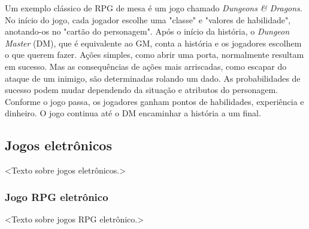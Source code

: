 \documentclass[
	12pt,					%
	openright,				%
	oneside,				%
	a4paper,				%
	bibjustif,				%
	chapter=TITLE,			%
	english,				%
	brazil,					%
	]{abntex2}
\begin{document}
		Um exemplo clássico de RPG de mesa é um jogo chamado \textit{Dungeons \& Dragons}.
		No início do jogo,
		cada jogador escolhe uma "classe"{} e "valores de habilidade",
		anotando-os no "cartão do personagem"{}.
		Após o início da história,
		o \textit{Dungeon Master} (DM), que é equivalente ao GM, conta a história
		e os jogadores escolhem o que querem fazer.
		Ações simples, como abrir uma porta, normalmente resultam em sucesso.
		Mas as consequências de ações mais arriscadas,
		como escapar do ataque de um inimigo,
		são determinadas rolando um dado.
		As probabilidades de sucesso podem mudar dependendo da situação e atributos do personagem.
		Conforme o jogo passa,
		os jogadores ganham pontos de habilidades, experiência e dinheiro.
		O jogo continua até o DM encaminhar a história a um final.
			
	
		\FloatBarrier
		\subsection{Jogos eletrônicos}
		<Texto sobre jogos eletrônicos.>
			
			\FloatBarrier
			\subsubsection{Jogo RPG eletrônico}
			<Texto sobre jogos RPG eletrônico.>
\end{document}
